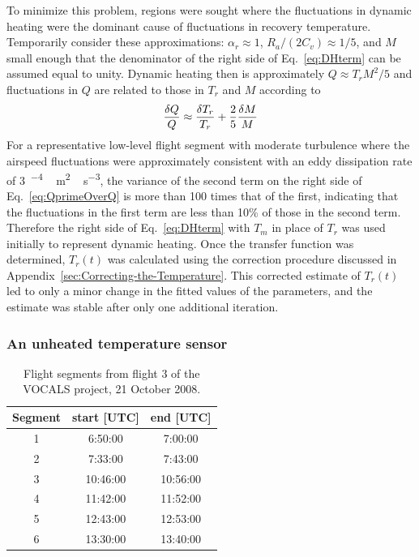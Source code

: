 \documentclass[amt, manuscript]{copernicus}
\begin{document}
To minimize this problem, regions were sought where the fluctuations in
dynamic heating were the dominant cause of fluctuations in recovery
temperature. Temporarily consider these approximations:
\(\alpha_{r}\approx1\), \(R_{a}/(2C_{v})\approx1/5\), and \(M\) small
enough that the denominator of the right side of Eq.~\eqref{eq:DHterm}
can be assumed equal to unity. Dynamic heating then is approximately
\(Q\approx T_{r}M^{2}/5\) and fluctuations in \(Q\) are related to those
in \(T_{r}\) and \(M\) according to \begin{equation}
\frac{\delta Q}{Q}\approx\frac{\delta T_{r}}{T_{r}}+\frac{2}{5}\frac{\delta M}{M}{\label{eq:QprimeOverQ}}
\end{equation} For a representative low-level flight segment with
moderate turbulence where the airspeed fluctuations were approximately
consistent with an eddy dissipation rate of
\unit{3^{-4}\,m^{2}\,s^{-3}}, the variance of the second term on
the right side of Eq.~\eqref{eq:QprimeOverQ} is more than 100 times that
of the first, indicating that the fluctuations in the first term are
less than 10\% of those in the second term. Therefore the right side of
Eq.~\eqref{eq:DHterm} with \(T_{m}\) in place of \(T_{r}\) was used
initially to represent dynamic heating. Once the transfer function was
determined, \(T_{r}(t)\) was calculated using the correction procedure
discussed in Appendix~\ref{sec:Correcting-the-Temperature}. This
corrected estimate of \(T_{r}(t)\) led to only a minor change in the
fitted values of the parameters, and the estimate was stable after only
one additional iteration.

\subsubsection{\texorpdfstring{An unheated temperature
sensor\label{subsec:The-unheated-Rosemount}}{An unheated temperature sensor}}

\begin{table}[t]
\caption{Flight segments from flight 3 of the VOCALS project, 21 October 2008.}
\begin{tabular}{|c|c|c|}
\hline 
\bf{Segment} & \bf{start [UTC]}& \bf{end [UTC]}\tabularnewline
\hline 
\hline 
1 & 6:50:00 & 7:00:00\tabularnewline
\hline 
2 & 7:33:00 & 7:43:00\tabularnewline
\hline 
3 & 10:46:00 & 10:56:00\tabularnewline
\hline 
4 & 11:42:00 & 11:52:00\tabularnewline
\hline 
5 & 12:43:00 & 12:53:00\tabularnewline
\hline 
6 & 13:30:00 & 13:40:00\tabularnewline
\hline 
\end{tabular}
\end{table}
\end{document}

